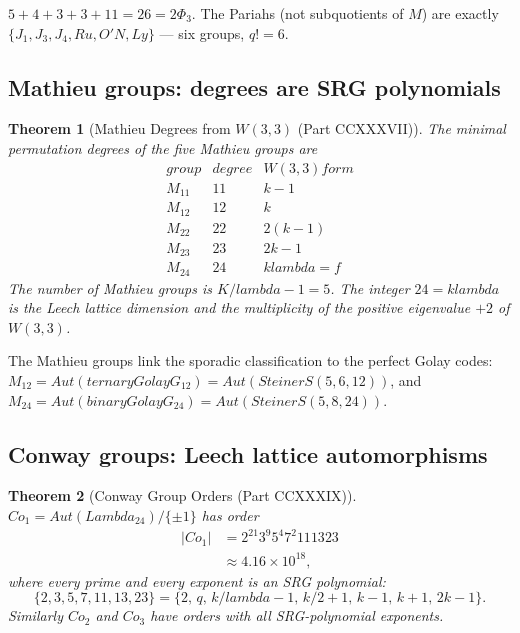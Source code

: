 \documentclass[11pt]{article}
\def\mathbb#1{#1}%
\def\mathrm#1{#1}%
\def\text#1{#1}%
\def\lambda{lambda}%
\def\Lambda{Lambda}%
\def\Phi#1{Phi#1}%
\def\cdot{ }%
\newtheorem*{theorem}{Theorem}
\begin{document}
$5 + 4 + 3 + 3 + 11 = 26 = 2\Phi_3$. The Pariahs (not subquotients of $\mathbb{M}$) are exactly $\{J_1, J_3, J_4, \mathrm{Ru}, \mathrm{O'N}, \mathrm{Ly}\}$ — six groups, $q! = 6$.

\subsection*{Mathieu groups: degrees are SRG polynomials}

\begin{theorem}[Mathieu Degrees from $W(3,3)$ (Part CCXXXVII)]
The minimal permutation degrees of the five Mathieu groups are
\[
\begin{array}{c|c|c}
\text{group} & \text{degree} & W(3,3) \text{ form} \\
\hline
M_{11} & 11 & k - 1 \\
M_{12} & 12 & k \\
M_{22} & 22 & 2(k - 1) \\
M_{23} & 23 & 2k - 1 \\
M_{24} & 24 & k\lambda = f
\end{array}
\]
The number of Mathieu groups is $K/\lambda - 1 = 5$. The integer $24 = k\lambda$ is the Leech lattice dimension and the multiplicity of the positive eigenvalue $+2$ of $W(3,3)$.
\end{theorem}

The Mathieu groups link the sporadic classification to the perfect Golay codes: $M_{12} = \mathrm{Aut}(\text{ternary Golay } G_{12}) = \mathrm{Aut}(\text{Steiner } S(5,6,12))$, and $M_{24} = \mathrm{Aut}(\text{binary Golay } G_{24}) = \mathrm{Aut}(\text{Steiner } S(5,8,24))$.

\subsection*{Conway groups: Leech lattice automorphisms}

\begin{theorem}[Conway Group Orders (Part CCXXXIX)]
$\mathrm{Co}_1 = \mathrm{Aut}(\Lambda_{24})/\{\pm 1\}$ has order
\[
\begin{aligned}
|\mathrm{Co}_1|
  &= 2^{21} \cdot 3^9 \cdot 5^4 \cdot 7^2 \cdot 11 \cdot 13 \cdot 23 \\
  &\approx 4.16 \times 10^{18},
\end{aligned}
\]
where every prime and every exponent is an SRG polynomial:
\[
\{2, 3, 5, 7, 11, 13, 23\} = \{2,\, q,\, k/\lambda - 1,\, k/2 + 1,\, k - 1,\, k + 1,\, 2k - 1\}.
\]
Similarly $\mathrm{Co}_2$ and $\mathrm{Co}_3$ have orders with all SRG-polynomial exponents.
\end{theorem}
\end{document}
